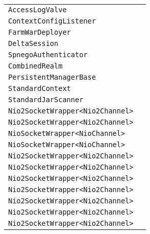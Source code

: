 \begin{center}
\begin{tabular}{ll}
\lstinline/AccessLogValve/&\raisebox{0pt}{\lstinline/ open()/}\\ 
\lstinline/ContextConfigListener/&\raisebox{0pt}{\lstinline/ processAnnotationsFile(File)/}\\ 
\lstinline/FarmWarDeployer/&\raisebox{0pt}{\lstinline/ booleancopy(Filefrom,Fileto)/}\\ 
\lstinline/DeltaSession/&\raisebox{0pt}{\lstinline/ doWriteObject(ObjectOutputstream)/}\\ 
\lstinline/SpnegoAuthenticator/&\raisebox{0pt}{\lstinline/ doAuthenticate(Requestrequest)/}\\ 
\lstinline/CombinedRealm/&\raisebox{0pt}{\lstinline/ PrincipalgetPrincipal(String)/}\\ 
\lstinline/PersistentManagerBase/&\raisebox{0pt}{\lstinline/ startInternal())/}\\ 
\lstinline/StandardContext/&\raisebox{0pt}{\lstinline/ checkUnusualURLPattern(String)/}\\ 
\lstinline/StandardJarScanner/&\raisebox{0pt}{\lstinline/ scan()/}\\ 
\lstinline/Nio2SocketWrapper<Nio2Channel>/&\raisebox{0pt}{\lstinline/ doClientAuth(SSLSupport)/}\\ 
\lstinline/Nio2SocketWrapper<Nio2Channel>/&\raisebox{0pt}{\lstinline/ doClientAuth(SSLSupport)/}\\ 
\lstinline/NioSocketWrapper<NioChannel>/&\raisebox{0pt}{\lstinline/ doClientAuth(SSLSupport)/}\\ 
\lstinline/NioSocketWrapper<NioChannel>/&\raisebox{0pt}{\lstinline/ doClientAuth(SSLSupport)/}\\ 
\lstinline/Nio2SocketWrapper<Nio2Channel>/&\raisebox{0pt}{\lstinline/ doClientAuth(SSLSupport)/}\\ 
\lstinline/Nio2SocketWrapper<Nio2Channel>/&\raisebox{0pt}{\lstinline/ doClientAuth(SSLSupport)/}\\ 
\lstinline/Nio2SocketWrapper<Nio2Channel>/&\raisebox{0pt}{\lstinline/ doClientAuth(SSLSupport)/}\\ 
\lstinline/Nio2SocketWrapper<Nio2Channel>/&\raisebox{0pt}{\lstinline/ doClientAuth(SSLSupport)/}\\ 
\lstinline/Nio2SocketWrapper<Nio2Channel>/&\raisebox{0pt}{\lstinline/ doClientAuth(SSLSupport)/}\\ 
\lstinline/Nio2SocketWrapper<Nio2Channel>/&\raisebox{0pt}{\lstinline/ doClientAuth(SSLSupport)/}\\ 
\lstinline/Nio2SocketWrapper<Nio2Channel>/&\raisebox{0pt}{\lstinline/ doClientAuth(SSLSupport)/}\\ 

\end{tabular}
\end{center}
